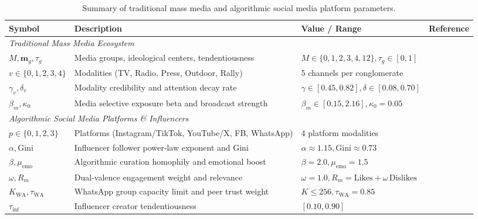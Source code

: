 \documentclass{article}
\begin{document}
\begin{table}[htbp]
\centering
\caption{Summary of traditional mass media and algorithmic social media platform parameters.}
\label{tab:media_parameters}
\footnotesize
\setlength{\tabcolsep}{4.5pt}
\begin{tabular}{lp{5.1cm}p{3.6cm}p{3.8cm}}
\toprule
\textbf{Symbol} & \textbf{Description} & \textbf{Value / Range} & \textbf{Reference} \\
\midrule
\multicolumn{4}{l}{\textit{Traditional Mass Media Ecosystem}} \\
$M, \mathbf{m}_g, \tau_g$ & Media groups, ideological centers, tendentiousness & $M \in \{0, 1, 2, 3, 4, 12\}, \tau_g \in [0, 1]$ & \citet{mullainathan2005market, gentzkow2006media} \\
$v \in \{0, 1, 2, 3, 4\}$ & Modalities (TV, Radio, Press, Outdoor, Rally) & 5 channels per conglomerate & \citet{kantar2023inside, reuters2023digital} \\
$\gamma_v, \delta_v$ & Modality credibility and attention decay rate & $\gamma \in [0.45, 0.82], \delta \in [0.08, 0.70]$ & \citet{wu2007novelty, downs1972up} \\
$\beta_m, \kappa_0$ & Media selective exposure beta and broadcast strength & $\beta_m \in [0.15, 2.16], \kappa_0 = 0.05$ & \citet{dandekar2013biased, dellavigna2007fox} \\
\midrule
\multicolumn{4}{l}{\textit{Algorithmic Social Media Platforms \& Influencers}} \\
$p \in \{0, 1, 2, 3\}$ & Platforms (Instagram/TikTok, YouTube/X, FB, WhatsApp) & 4 platform modalities & \citet{reuters2023digital, cinelli2021echo} \\
$\alpha, \mathrm{Gini}$ & Influencer follower power-law exponent and Gini & $\alpha \approx 1.15, \mathrm{Gini} \approx 0.73$ & \citet{barabasi1999emergence, bianconi2001competition} \\
$\beta, \mu_{\mathrm{emo}}$ & Algorithmic curation homophily and emotional boost & $\beta = 2.0, \mu_{\mathrm{emo}} = 1.5$ & \citet{brady2017emotion, vosoughi2018spread} \\
$\omega, R_m$ & Dual-valence engagement weight and relevance & $\omega = 1.0, R_m = \mathrm{Likes} + \omega\,\mathrm{Dislikes}$ & \citet{crockett2017moral, bail2018exposure} \\
$K_{\mathrm{WA}}, \tau_{\mathrm{WA}}$ & WhatsApp group capacity limit and peer trust weight & $K \le 256, \tau_{\mathrm{WA}} = 0.85$ & \citet{resende2019whatsapp, garimella2020images} \\
$\tau_{\mathrm{inf}}$ & Influencer creator tendentiousness & $[0.10, 0.90]$ & \citet{sasahara2021social, tucker2018social} \\
\bottomrule
\end{tabular}
\end{table}
\end{document}
